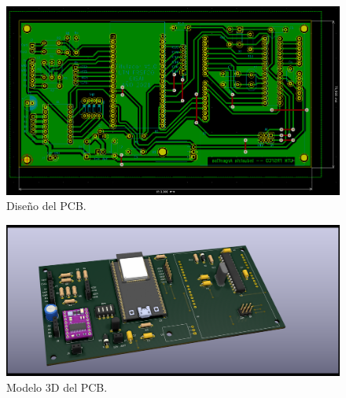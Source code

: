 \begin{figure}[htbp]
	\centering
	\includegraphics[width=1.0\textwidth]{./Figures/pcb.png}
	\caption{Diseño del PCB.}
	\label{fig:pcb}
\end{figure}

\begin{figure}[htbp]
	\centering
	\includegraphics[width=1.0\textwidth]{./Figures/pcb3D.png}
	\caption{Modelo 3D del PCB.}
	\label{fig:pcb3D}
\end{figure}
